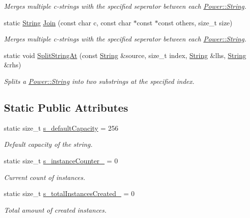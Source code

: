\begin{DoxyCompactItemize}
\begin{DoxyCompactList}\small\item\em Merges multiple c-\/strings with the specified seperator between each \hyperlink{class_power_1_1_string}{Power\+::\+String}. \end{DoxyCompactList}\item 
static \hyperlink{class_power_1_1_string}{String} \hyperlink{class_power_1_1_string_ad1a312071c2e9f15b6ca614d13ac8ef8}{Join} (const char c, const char $\ast$const $\ast$const others, size\+\_\+t size)
\begin{DoxyCompactList}\small\item\em Merges multiple c-\/strings with the specified seperator between each \hyperlink{class_power_1_1_string}{Power\+::\+String}. \end{DoxyCompactList}\item 
static void \hyperlink{class_power_1_1_string_a706749eb38e54ab15410821f1713b5c7}{Split\+String\+At} (const \hyperlink{class_power_1_1_string}{String} \&source, size\+\_\+t index, \hyperlink{class_power_1_1_string}{String} \&lhs, \hyperlink{class_power_1_1_string}{String} \&rhs)
\begin{DoxyCompactList}\small\item\em Splits a \hyperlink{class_power_1_1_string}{Power\+::\+String} into two substrings at the specified index. \end{DoxyCompactList}\end{DoxyCompactItemize}
\subsection*{Static Public Attributes}
\begin{DoxyCompactItemize}
\item 
static size\+\_\+t \hyperlink{class_power_1_1_string_a9ffb47096926f8bf69666dae8cd4e92e}{s\+\_\+default\+Capacity} = 256
\begin{DoxyCompactList}\small\item\em Default capacity of the string. \end{DoxyCompactList}\item 
static size\+\_\+t \hyperlink{class_power_1_1_string_af0eb9ed7cf032a152135aae322389977}{s\+\_\+instance\+Counter\+\_\+} = 0
\begin{DoxyCompactList}\small\item\em Current count of instances. \end{DoxyCompactList}\item 
static size\+\_\+t \hyperlink{class_power_1_1_string_a629d518a942c2d23c44f509fea885cb5}{s\+\_\+total\+Instances\+Created\+\_\+} = 0
\begin{DoxyCompactList}\small\item\em Total amount of created instances. \end{DoxyCompactList}\end{DoxyCompactItemize}


